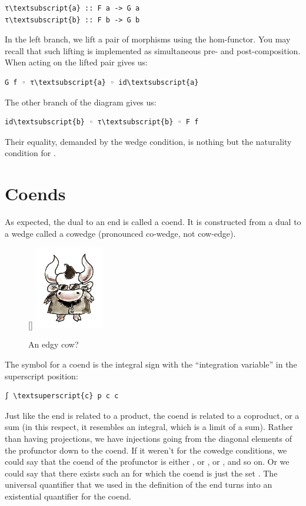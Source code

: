 \begin{Verbatim}[commandchars=\\\{\}]
τ\textsubscript{a} :: F a -> G a
τ\textsubscript{b} :: F b -> G b
\end{Verbatim}
In the left branch, we lift a pair of morphisms
 using the hom-functor. You
may recall that such lifting is implemented as simultaneous pre- and
post-composition. When acting on  the lifted pair gives us:

\begin{Verbatim}[commandchars=\\\{\}]
G f ◦ τ\textsubscript{a} ◦ id\textsubscript{a}
\end{Verbatim}
The other branch of the diagram gives us:

\begin{Verbatim}[commandchars=\\\{\}]
id\textsubscript{b} ◦ τ\textsubscript{b} ◦ F f
\end{Verbatim}
Their equality, demanded by the wedge condition, is nothing but the
naturality condition for .

\section{Coends}\label{coends}
As expected, the dual to an end is called a coend. It is constructed
from a dual to a wedge called a cowedge (pronounced co-wedge, not
cow-edge).

\begin{figure}
\raisebox{0pt}[\dimexpr{}\baselineskip\relax]{
\includegraphics[width=30mm]{images/end-31.jpg}}%
\caption{An edgy cow?}
\end{figure}

The symbol for a coend is the integral sign with the ``integration
variable'' in the superscript position:

\begin{Verbatim}[commandchars=\\\{\}]
∫ \textsuperscript{c} p c c
\end{Verbatim}
Just like the end is related to a product, the coend is related to a
coproduct, or a sum (in this respect, it resembles an integral, which is
a limit of a sum). Rather than having projections, we have injections
going from the diagonal elements of the profunctor down to the coend. If
it weren't for the cowedge conditions, we could say that the coend of
the profunctor  is either , or
, or , and so on. Or we could say that
there exists such an  for which the coend is just the set
. The universal quantifier that we used in the
definition of the end turns into an existential quantifier for the
coend.

